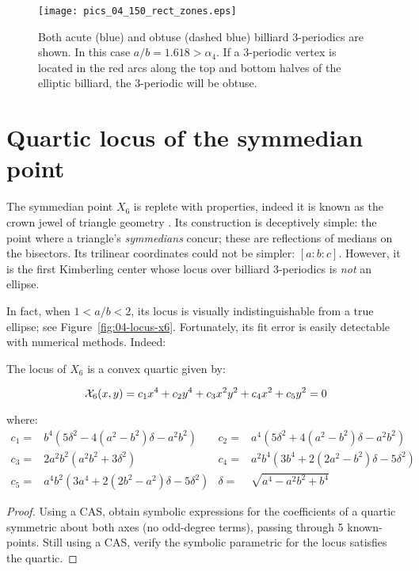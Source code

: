 \begin{figure}
    \centering
    \texttt{[image: pics\_04\_150\_rect\_zones.eps]}
    \caption{Both acute (blue) and obtuse (dashed blue) billiard 3-periodics are shown. In this case $a/b=1.618>\alpha_4$. If a 3-periodic vertex is located in the red arcs along the top and bottom halves of the elliptic billiard, the 3-periodic will be obtuse.}
\label{fig:04-obtuse-zones}
\end{figure}


\section{Quartic locus of the symmedian point }
\label{sec:symmedian}

The symmedian point $X_6$ is replete with properties, indeed it is known as the crown jewel of triangle geometry \cite[Symmedian Point]{mw}. Its construction is deceptively simple: the point where a triangle's {\em symmedians} concur; these are reflections of medians on the bisectors. Its trilinear coordinates could not be simpler: $[a:b:c]$. However, it is the first Kimberling center whose locus over billiard 3-periodics is {\em not} an ellipse. 

In fact, when $1<a/b<2$, its locus is visually indistinguishable from a true ellipse; see Figure~\ref{fig:04-locus-x6}. Fortunately, its fit error is easily detectable with numerical methods. Indeed:

\begin{proposition}
The locus of $X_6$ is a convex quartic given by:

\begin{equation*}
  \mathcal{X}_6(x,y)=c_1 x^4+c_2 y^4+c_3 x^2 y^2+ c_4 x^2 + c_5 y^2 = 0
\end{equation*}

\noindent where:
$$
\begin{array}{rlrl}
c_1=&b^4(5\delta^2-4(a^2-b^2)\delta -a^2 b^2)&c_2=&a^4(5\delta^2+4(a^2-b^2)\delta-a^2b^2) \\
c_3=&2a^2 b^2(a^2 b^2+3\delta^2)&c_4=&a^2 b^4(3 b^4+2(2 a^2-b^2)\delta-5\delta^2)\\
c_5=&a^4 b^2(3 a^4+2(2 b^2-a^2)\delta-5\delta^2)&\delta=&\sqrt{a^4-a^2 b^2+b^4}
\end{array}
$$
\end{proposition}

\begin{proof}
Using a CAS, obtain symbolic expressions for the coefficients of a quartic symmetric about both axes (no odd-degree terms), passing through 5 known-points. Still using a CAS, verify the symbolic parametric for the locus satisfies the quartic.
\end{proof}

